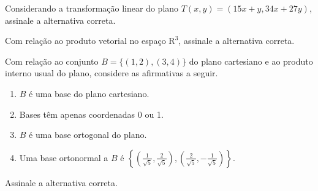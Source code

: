 \documentclass[10pt,a4paper]{article}
\begin{document}
%
{
\def\AMCbeginQuestion#1#2{\par\noindent{\bf (POSCOMP 2013 - Questão 05)}}
\begin{question}{} Considerando a transformação linear do plano $T(x,y)=(15x+y,34x+27y)$, assinale a alternativa correta.
\begin{choices}
\end{choices}
\end{question}
}
%
{
\def\AMCbeginQuestion#1#2{\par\noindent{\bf (POSCOMP 2013 - Questão 06)}}
\begin{question}{} Com relação ao produto vetorial no espaço $\mathrm{R}^{3}$, assinale a alternativa correta.
\begin{choices}
\end{choices}
\end{question}
}
%
{
\def\AMCbeginQuestion#1#2{\par\noindent{\bf (POSCOMP 2013 - Questão 08)}}
\begin{question}{} Com relação ao conjunto $B=\{(1,2),(3,4)\}$ do plano cartesiano e ao produto interno usual do plano, considere as afirmativas a seguir.
\begin{enumerate}
\item[I.] $B$ é uma base do plano cartesiano.
\item[II.] Bases têm apenas coordenadas 0 ou 1.
\item[III.] $B$ é uma base ortogonal do plano.
\item[IV.] Uma base ortonormal a $B$ é $\left\{\left(\frac{1}{\sqrt5},\frac{2}{\sqrt5}\right),\left(\frac{2}{\sqrt5},-\frac{1}{\sqrt5}\right)\right\}$.
\end{enumerate}
Assinale a alternativa correta.
\begin{choices}
\end{choices}
\end{question}
}
\end{document}
